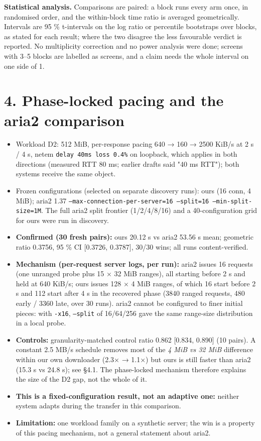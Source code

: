 \documentclass[10pt,a4paper]{article}
\begin{document}
\textbf{Statistical analysis.} Comparisons are paired: a block runs every arm once, in randomised order, and the within-block time ratio is averaged geometrically. Intervals are 95 \% t-intervals on the log ratio or percentile bootstraps over blocks, as stated for each result; where the two disagree the less favourable verdict is reported. No multiplicity correction and no power analysis were done; screens with 3–5 blocks are labelled as screens, and a claim needs the whole interval on one side of 1.


\section*{4. Phase-locked pacing and the aria2 comparison}

\begin{itemize}
\item Workload D2: 512 MiB, per-response pacing 640 → 160 → 2500 KiB/s at 2 s / 4 s, netem \texttt{delay 40ms loss 0.4\%} on loopback, which applies in both directions (measured RTT 80 ms; earlier drafts said "40 ms RTT"); both systems receive the same object.
\item Frozen configurations (selected on separate discovery runs): ours (16 conn, 4 MiB); aria2 1.37 \texttt{--max-connection-per-server=16 --split=16 --min-split-size=1M}. The full aria2 split frontier (1/2/4/8/16) and a 40-configuration grid for ours were run in discovery.
\item \textbf{Confirmed (30 fresh pairs):} ours 20.12 s vs aria2 53.56 s mean; geometric ratio 0.3756, 95 \% CI [0.3726, 0.3787], 30/30 wins; all runs content-verified.
\item \textbf{Mechanism (per-request server logs, per run):} aria2 issues 16 requests (one unranged probe plus 15 × 32 MiB ranges), all starting before 2 s and held at 640 KiB/s; ours issues 128 × 4 MiB ranges, of which 16 start before 2 s and 112 start after 4 s in the recovered phase (3840 ranged requests, 480 early / 3360 late, over 30 runs). aria2 cannot be configured to finer initial pieces: with \texttt{-x16}, \texttt{--split} of 16/64/256 gave the same range-size distribution in a local probe.
\item \textbf{Controls:} granularity-matched control ratio 0.862 [0.834, 0.890] (10 pairs). A constant 2.5 MB/s schedule removes most of the \emph{4 MiB vs 32 MiB} difference within our own downloader (2.3× → 1.1×) but ours is still faster than aria2 (15.3 s vs 24.8 s); see §4.1. The phase-locked mechanism therefore explains the size of the D2 gap, not the whole of it.
\item \textbf{This is a fixed-configuration result, not an adaptive one:} neither system adapts during the transfer in this comparison.
\item \textbf{Limitation:} one workload family on a synthetic server; the win is a property of this pacing mechanism, not a general statement about aria2.
\end{itemize}
\end{document}
